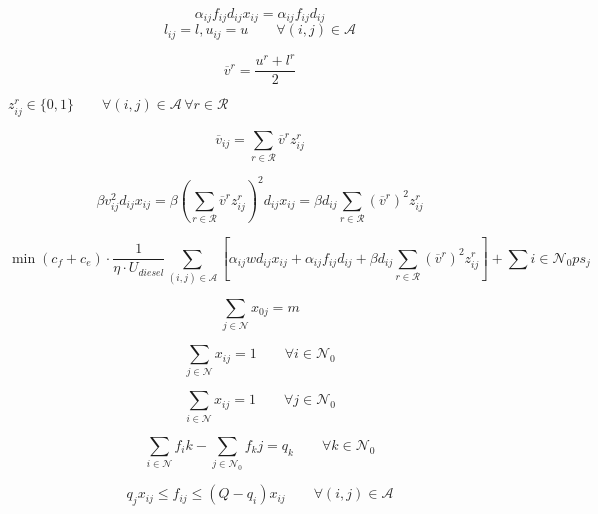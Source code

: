 \documentclass{article}
\begin{document}
			$$\alpha_{ij}f_{ij}d_{ij}x_{ij} = \alpha_{ij}f_{ij}d_{ij}$$
			$$l_{ij} = l, u_{ij} = u \qquad \forall (i,j) \in \mathcal{A}$$

			\begin{equation}
				\label{eq:average_speed}
				\overline v ^ r = \frac{u^r + l^r}{2}
			\end{equation}

			$z_{ij}^{r} \in \{0,1\} \qquad \forall (i,j) \in \mathcal{A} \, \forall r \in \mathcal{R}$

			$$\overline v_{ij} = \sum_{r \in \mathcal{R}} \overline v^r z_{ij}^r $$

			$$\beta v_{ij}^2 d_{ij} x_{ij} = 
			\beta \left(\sum_{r \in \mathcal{R}} \overline v^r z_{ij}^r \right)^2 d_{ij} x_{ij} = 
			\beta d_{ij} \sum_{r \in \mathcal{R}} (\overline v^r)^2 z_{ij}^r
			$$

			\begin{equation}
				\label{eq:objective}
				\min
				(c_f + c_e) \cdot 
				\frac{1}{\eta \cdot U_{diesel}} 
				\sum_{(i,j) \in \mathcal{A}} \left[
					\alpha_{ij}wd_{ij}x_{ij} + 
					\alpha_{ij}f_{ij}d_{ij} + 
					\beta d_{ij} \sum_{r \in \mathcal{R}} (\overline v^r)^2 z_{ij}^r
				\right] + 
				\sum{i \in \mathcal{N}_0} p s_j
			\end{equation}

			\begin{equation}
				\label{eq:fleet_usage}
				\sum_{j \in \mathcal{N}} x_{0j} = m
			\end{equation}

			\begin{equation}
				\label{eq:single_exit}
				\sum_{j \in \mathcal{N}} x_{ij} = 1 
				\qquad 
				\forall i \in \mathcal{N}_0
			\end{equation}

			\begin{equation}
				\label{eq:single_entrance}
				\sum_{i \in \mathcal{N}} x_{ij} = 1 
				\qquad 
				\forall j \in \mathcal{N}_0
			\end{equation}

			\begin{equation}
				\label{eq:flux_balance}
				\sum_{i \in \mathcal{N}}f_ik - \sum_{j \in \mathcal{N}_0}f_kj = q_k  
				\qquad
				\forall k \in \mathcal{N}_0
			\end{equation}

			\begin{equation}
				\label{eq:capacity_constraint}
				q_j x_{ij} \leq f_{ij} \leq (Q - q_i)x_{ij} 
				\qquad
				\forall (i,j) \in \mathcal{A} 
			\end{equation}
\end{document}
